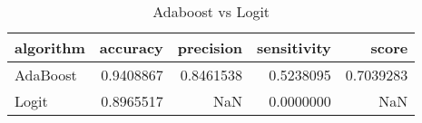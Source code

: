 \begin{table}

\caption{Adaboost vs Logit}
\centering
\begin{tabular}[t]{lrrrr}
\toprule
algorithm & accuracy & precision & sensitivity & score\\
\midrule
AdaBoost & 0.9408867 & 0.8461538 & 0.5238095 & 0.7039283\\
Logit & 0.8965517 & NaN & 0.0000000 & NaN\\
\bottomrule
\end{tabular}
\end{table}
